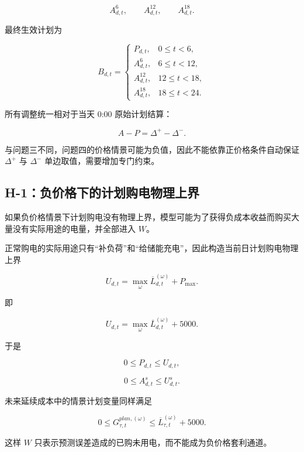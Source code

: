 \[
A^6_{d,t},
\qquad
A^{12}_{d,t},
\qquad
A^{18}_{d,t}.
\]

最终生效计划为

\begin{equation}
B_{d,t}
=
\begin{cases}
P_{d,t},&0\le t<6,\\
A^6_{d,t},&6\le t<12,\\
A^{12}_{d,t},&12\le t<18,\\
A^{18}_{d,t},&18\le t<24.
\end{cases}
\end{equation}

所有调整统一相对于当天 0:00 原始计划结算：

\begin{equation}
A-P
=
\Delta^+-\Delta^-.
\end{equation}

与问题三不同，问题四的价格情景可能为负值，因此不能依靠正价格条件自动保证 \(\Delta^+\) 与 \(\Delta^-\) 单边取值，需要增加专门约束。

\subsection{H-1：负价格下的计划购电物理上界}

如果负价格情景下计划购电没有物理上界，模型可能为了获得负成本收益而购买大量没有实际用途的电量，并全部进入 \(W\)。

正常购电的实际用途只有“补负荷”和“给储能充电”，因此构造当前日计划购电物理上界

\begin{equation}
U_{d,t}
=
\max_{\omega}
\overline L_{d,t}^{(\omega)}
+
P_{\max}.
\end{equation}

即

\[
U_{d,t}
=
\max_{\omega}
\overline L_{d,t}^{(\omega)}
+
5000.
\]

于是

\[
0\le P_{d,t}\le U_{d,t},
\]

\begin{equation}
0\le A^s_{d,t}\le U^s_{d,t}.
\end{equation}

未来延续成本中的情景计划变量同样满足

\begin{equation}
0\le
G_{\tau,t}^{plan,(\omega)}
\le
\overline L_{\tau,t}^{(\omega)}
+
5000.
\end{equation}

这样 \(W\) 只表示预测误差造成的已购未用电，而不能成为负价格套利通道。

